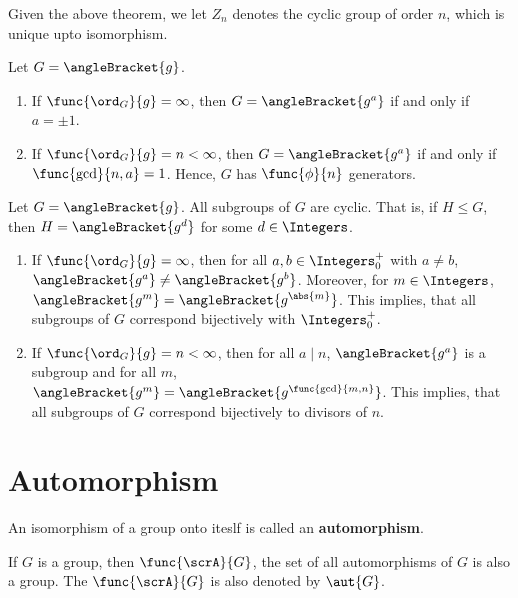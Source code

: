 Given the above theorem, we let \(Z_n\) denotes the cyclic group of order \(n\), which is unique upto isomorphism.

\begin{proposition}
    Let \(G = \angleBracket{g}\).
    \begin{enumerate}
        \item If \(\func{\ord_G}{g} = \infty\), then \(G = \angleBracket{g^a}\) if and only if \(a = \pm 1\).
        \item If \(\func{\ord_G}{g} = n < \infty\), then \(G = \angleBracket{g^a}\) if and only if \(\func{\gcd}{n,a} = 1\). Hence, \(G\) has \(\func{\phi}{n}\) generators.
    \end{enumerate}
\end{proposition}

\begin{proposition}
    Let \(G = \angleBracket{g}\). All subgroups of \(G\) are cyclic. That is, if \(H \leq G\), then \(H = \angleBracket{g^d}\) for some \(d \in \Integers\).
    \begin{enumerate}
        \item If \(\func{\ord_G}{g} =  \infty\), then for all \(a,b \in \Integers^+_0\) with \(a\neq b\), \(\angleBracket{g^a} \neq \angleBracket{g^b}\). Moreover, for \(m \in \Integers\), \( \angleBracket{g^m} = \angleBracket{g^{\abs{m}}}\). This implies, that all  subgroups of \(G\) correspond bijectively with \(\Integers^+_0\).
        \item If \(\func{\ord_G}{g} = n < \infty\), then for all \(a \mid n\), \(\angleBracket{g^a}\) is a subgroup and for all \(m\),  \( \angleBracket{g^m} = \angleBracket{g^{\func{\gcd}{m,n}}}\). This implies, that all  subgroups of \(G\) correspond bijectively to divisors of \(n\).
    \end{enumerate}
\end{proposition}

\section{Automorphism}
\begin{definition}
    An isomorphism of a group onto iteslf is called an \textbf{automorphism}.
\end{definition}

\begin{lemma}
    If \(G\) is a group, then \(\func{\scrA}{G}\), the set of all automorphisms of \(G\) is also a group. The \(\func{\scrA}{G}\) is also denoted by \(\aut{G}\).
\end{lemma}

